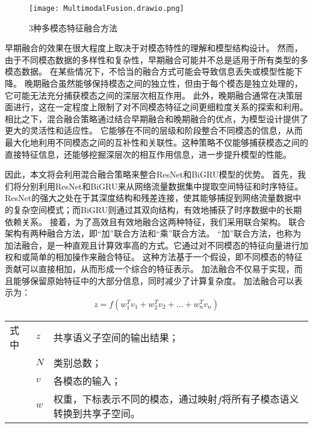 \begin{figure}[h]
	\centering
	\texttt{[image: MultimodalFusion.drawio.png]}
	\caption{3种多模态特征融合方法}
	\label{fig:MultimodalFusio}
\end{figure}


早期融合的效果在很大程度上取决于对模态特性的理解和模型结构设计。
然而，由于不同模态数据的多样性和复杂性，早期融合可能并不总是适用于所有类型的多模态数据。
在某些情况下，不恰当的融合方式可能会导致信息丢失或模型性能下降。
晚期融合虽然能够保持模态之间的独立性，但由于每个模态是独立处理的，它可能无法充分捕获模态之间的深层次相互作用。
此外，晚期融合通常在决策层面进行，这在一定程度上限制了对不同模态特征之间更细粒度关系的探索和利用。
相比之下，混合融合策略通过结合早期融合和晚期融合的优点，为模型设计提供了更大的灵活性和适应性。
它能够在不同的层级和阶段整合不同模态的信息，从而最大化地利用不同模态之间的互补性和关联性。这种策略不仅能够捕获模态之间的直接特征信息，还能够挖掘深层次的相互作用信息，进一步提升模型的性能。\par



因此，本文将会利用混合融合策略来整合ResNet和BiGRU模型的优势。
首先，我们将分别利用ResNet和BiGRU来从网络流量数据集中提取空间特征和时序特征。
ResNet的强大之处在于其深度结构和残差连接，使其能够捕捉到网络流量数据中的复杂空间模式；而BiGRU则通过其双向结构，有效地捕获了时序数据中的长期依赖关系。
接着，为了高效且有效地融合这两种特征，我们采用联合架构。
联合架构有两种融合方法，即“加”联合方法和“乘”联合方法。
“加”联合方法，也称为加法融合，是一种直观且计算效率高的方式。它通过对不同模态的特征向量进行加权和或简单的相加操作来融合特征。
这种方法基于一个假设，即不同模态的特征贡献可以直接相加，从而形成一个综合的特征表示。
加法融合不仅易于实现，而且能够保留原始特征中的大部分信息，同时减少了计算复杂度。
加法融合可以表示为：
\begin{equation}
	z = f(w_1^Tv_1 + w_2^Tv_2+ \dots + w_n^Tv_n)
\end{equation}
\begin{flushleft}
	\renewcommand\arraystretch{1.25}
	\begin{tabularx}{\textwidth}{@{}>{\normalsize\rm}l@{\quad}>{\normalsize\rm}l@{——}>{\normalsize\rm}X@{}}
		式中 & $z$ & 共享语义子空间的输出结果；                                              \\
		     & $N$ & 类别总数；                                                              \\
		     & $v$ & 各模态的输入；                                                          \\
		     & $w$ & 权重，下标表示不同的模态，通过映射$f$将所有子模态语义转换到共享子空间。 \\
	\end{tabularx}\vspace{.5ex}
\end{flushleft}


